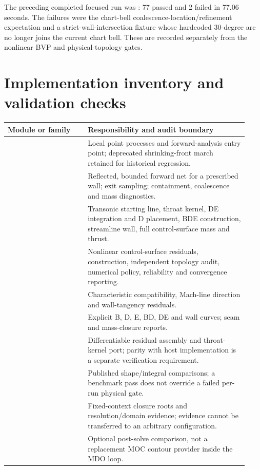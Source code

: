 The preceding completed focused run was
:
77 passed and 2 failed in 77.06 seconds. The failures were the chart-bell
coalescence-location/refinement expectation and a strict-wall-intersection fixture
whose hardcoded 30-degree arc no longer joins the current chart bell. These are
recorded separately from the nonlinear BVP and physical-topology gates.

\section{Implementation inventory and validation checks}
\begin{longtable}{@{}P{0.31\linewidth}P{0.62\linewidth}@{}}
\toprule\textbf{Module or family} & \textbf{Responsibility and audit boundary}\\\midrule
\endhead
{} & Local point processes and forward-analysis entry point; deprecated shrinking-front march retained for historical regression.\\
 & Reflected, bounded forward net for a prescribed wall; exit sampling; containment, coalescence and mass diagnostics.\\
 & Transonic starting line, throat kernel, DE integration and D placement, BDE construction, streamline wall, full control-surface mass and thrust.\\
 & Nonlinear control-surface residuals, construction, independent topology audit, numerical policy, reliability and convergence reporting.\\
 & Characteristic compatibility, Mach-line direction and wall-tangency residuals.\\
 & Explicit B, D, E, BD, DE and wall curves; seam and mass-closure reports.\\
 & Differentiable residual assembly and throat-kernel port; parity with host implementation is a separate verification requirement.\\
 & Published shape/integral comparisons; a benchmark pass does not override a failed per-run physical gate.\\
 & Fixed-context closure roots and resolution/domain evidence; evidence cannot be transferred to an arbitrary configuration.\\
 & Optional post-solve comparison, not a replacement MOC contour provider inside the MDO loop.\\
\bottomrule
\end{longtable}

